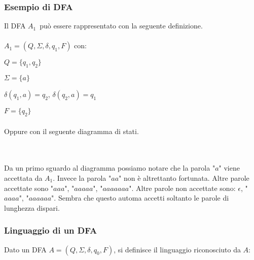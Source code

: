 \documentclass[]{article}
\begin{document}
\newpage
\subsubsection{Esempio di DFA}

Il DFA \mbox{$A_1$}\ può essere rappresentato con la seguente definizione.
\\
\\
\mbox{$A_1 = (Q, \Sigma, \delta, q_1, F)$} con:

\mbox{$Q = \{ q_1, q_2 \}$}

\mbox{$\Sigma = \{ a \}$}

\mbox{$\delta(q_1, a) = q_2$}, \mbox{$\delta(q_2, a) = q_1$}

\mbox{$F = \{ q_2 \}$}
\\
\\
Oppure con il seguente diagramma di stati.
\\
\\
\\
Da un primo sguardo al diagramma possiamo notare che la parola "\mbox{$a$}" viene accettata da \mbox{$A_1$}.
Invece la parola "\mbox{$aa$}" non è altrettanto fortunata. Altre parole accettate sono "\mbox{$aaa$}",
"\mbox{$aaaaa$}", "\mbox{$aaaaaaa$}".
Altre parole non accettate sono: \mbox{$\epsilon$}, "\mbox{$aaaa$}", "\mbox{$aaaaaa$}". Sembra che questo automa
accetti soltanto le parole di lunghezza dispari.



\subsubsection{Linguaggio di un DFA}

Dato un DFA \mbox{$A = (Q, \Sigma, \delta, q_0, F)$}, si definisce il linguaggio riconosciuto da \mbox{$A$}:
\\
\end{document}
